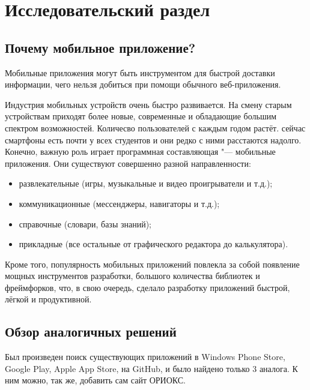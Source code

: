 \chapter{Исследовательский раздел}
\label{ch:research}
%
%

\section{Почему мобильное приложение?}
\label{sec:whyApp}

Мобильные приложения могут быть инструментом для быстрой доставки информации, чего нельзя добиться при помощи обычного веб-приложения.

Индустрия мобильных устройств очень быстро развивается.
На смену старым устройствам приходят более новые, современные и обладающие большим спектром возможностей.
Количесво пользователей с каждым годом растёт.
сейчас смартфоны есть почти у всех студентов и они редко с ними расстаются надолго.
Конечно, важную роль играет программная составляющая "--- мобильные приложения.
Они существуют совершенно разной направленности:
\begin{itemize}
  \item развлекательные (игры, музыкальные и видео проигрыватели и т.д.);
  \item коммуникационные (мессенджеры, навигаторы и т.д.);
  \item справочные (словари, базы знаний);
  \item прикладные (все остальные от графического редактора до калькулятора).
\end{itemize}

Кроме того, популярность мобильных приложений повлекла за собой появление мощных инструментов разработки, большого количества библиотек и фреймфорков, что, в свою очередь, сделало разработку приложений быстрой, лёгкой и продуктивной.


\section{Обзор аналогичных решений}
\label{sec:analogs}

Был произведен поиск существующих приложений в Windows Phone Store, Google Play, Apple App Store, на GitHub, и было найдено только 3 аналога.
К ним можно, так же, добавить сам сайт ОРИОКС.

